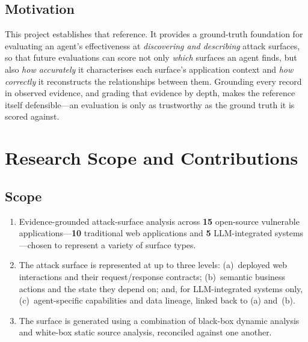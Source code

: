 \documentclass[11pt,a4paper]{article}
\begin{document}
\subsection{Motivation}
This project establishes that reference. It provides a ground-truth foundation for
evaluating an agent's effectiveness at \emph{discovering and describing} attack surfaces,
so that future evaluations can score not only \emph{which} surfaces an agent finds, but
also \emph{how accurately} it characterises each surface's application context and
\emph{how correctly} it reconstructs the relationships between them. Grounding every
record in observed evidence, and grading that evidence by depth, makes the reference
itself defensible---an evaluation is only as trustworthy as the ground truth it is scored
against.

\section{Research Scope and Contributions}

\subsection{Scope}
\begin{enumerate}[leftmargin=1.6em,itemsep=2pt]
\item Evidence-grounded attack-surface analysis across \textbf{15} open-source
      vulnerable applications---\textbf{10} traditional web applications and \textbf{5}
      LLM-integrated systems---chosen to represent a variety of surface types.
\item The attack surface is represented at up to three levels:
      (a)~deployed web interactions and their request/response contracts;
      (b)~semantic business actions and the state they depend on; and, for
      LLM-integrated systems only,
      (c)~agent-specific capabilities and data lineage, linked back to (a) and~(b).
\item The surface is generated using a combination of black-box dynamic analysis and
      white-box static source analysis, reconciled against one another.
\end{enumerate}
\end{document}
